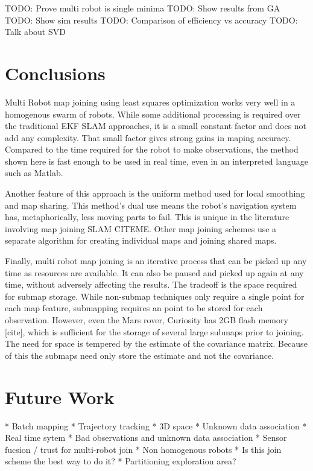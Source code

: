\documentclass[12pt]{report}
\begin{document}
TODO: Prove multi robot is single minima
TODO: Show results from GA
TODO: Show sim results
TODO: Comparison of efficiency vs accuracy
TODO: Talk about SVD

\chapter{Conclusions}

	Multi Robot map joining using least squares optimization works very well in a homogenous swarm of robots.  While some additional processing is required over the traditional EKF SLAM approaches, it is a small constant factor and does not add any complexity.  That small factor gives strong gains in maping accuracy.  Compared to the time required for the robot to make observations, the method shown here is fast enough to be used in real time, even in an interpreted language such as Matlab.
	
	Another feature of this approach is the uniform method used for local smoothing and map sharing.  This method's dual use means the robot's navigation system has, metaphorically, less moving parts to fail.  This is unique in the literature involving map joining SLAM {CITEME}.  Other map joining schemes use a separate algorithm for creating individual maps and joining shared maps. 
	
	Finally, multi robot map joining is an iterative process that can be picked up any time as resources are available.  It can also be paused and picked up again at any time, without adversely affecting the results.  The tradeoff is the space required for submap storage.  While non-submap techniques only require a single point for each map feature, submapping requires an point to be stored for each observation.  However, even the Mars rover, Curiosity has 2GB flash memory [cite], which is sufficient for the storage of several large submaps prior to joining.  The need for space is tempered by the estimate of the covariance matrix.  Because of this the submaps need only store the estimate and not the covariance.
	

\chapter{Future Work}

* Batch mapping 
* Trajectory tracking
* 3D space
* Unknown data association
* Real time sytem
* Bad observations and unknown data association
* Sensor fucsion / trust for multi-robot join
* Non homogenous robots
* Is this join scheme the best way to do it?
* Partitioning exploration area?
\end{document}
